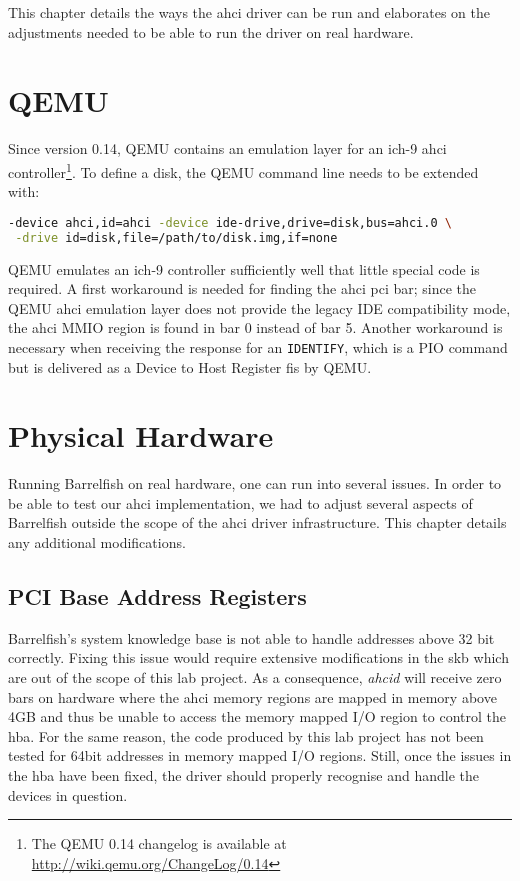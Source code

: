 This chapter details the ways the \ac{ahci} driver can be 
run and elaborates on the adjustments needed to be able to 
run the driver on real hardware.

\section{QEMU}

Since version 0.14, QEMU contains an emulation layer for an \acs{ich}-9
\ac{ahci} controller\footnote{The QEMU 0.14 changelog is available at
\url{http://wiki.qemu.org/ChangeLog/0.14}}. To define a disk, the QEMU command
line needs to be extended with:

\begin{lstlisting}[language=bash]
 -device ahci,id=ahci -device ide-drive,drive=disk,bus=ahci.0 \
 -drive id=disk,file=/path/to/disk.img,if=none
\end{lstlisting}

QEMU emulates an \acs{ich}-9 controller sufficiently well that little special
code is required. A first workaround is needed for finding the \ac{ahci}
\acs{pci} \ac{bar}; since the QEMU \ac{ahci} emulation layer does not provide
the legacy IDE compatibility mode, the \ac{ahci} MMIO region is found in
\ac{bar} 0 instead of \ac{bar} 5. Another workaround is necessary when
receiving the response for an {\tt IDENTIFY}, which is a PIO command but is
delivered as a Device to Host Register \ac{fis} by QEMU.

\section{Physical Hardware}

Running Barrelfish on real hardware, one can run into several issues. In order
to be able to test our \ac{ahci} implementation, we had to adjust several
aspects of Barrelfish outside the scope of the \ac{ahci} driver infrastructure.
This chapter details any additional modifications.

\subsection{PCI Base Address Registers}

Barrelfish's system knowledge base is not able to handle addresses above 32 bit
correctly. Fixing this issue would require extensive modifications in the
\acs{skb} which are out of the scope of this lab project. As a consequence,
\emph{ahcid} will receive zero \acp{bar} on hardware where the \ac{ahci} memory
regions are mapped in memory above 4GB and thus be unable to access the memory
mapped I/O region to control the \ac{hba}. For the same reason, the code produced by
this lab project has not been tested for 64bit addresses in memory mapped I/O
regions.  Still, once the issues in the \acs{hba} have been fixed, the driver should
properly recognise and handle the devices in question.

